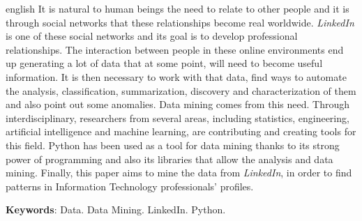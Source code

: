 \begin{resumo}[ABSTRACT]
 \begin{otherlanguage*}{english}
   It is natural to human beings the need to relate to other people and it is through social networks that these relationships become real worldwide. \textit{LinkedIn} is one of these social networks and its goal is to develop professional relationships. The interaction between people in these online environments end up generating a lot of data that at some point, will need to become useful information. It is then necessary to work with that data, find ways to automate the analysis, classification, summarization, discovery and characterization of them and also point out some anomalies. Data mining comes from this need. Through interdisciplinary, researchers from several areas, including statistics, engineering, artificial intelligence and machine learning, are contributing and creating tools for this field. Python has been used as a tool for data mining thanks to its strong power of programming and also its libraries that allow the analysis and data mining. Finally, this paper aims to mine the data from \textit{LinkedIn}, in order to find patterns in Information Technology professionals' profiles.
   
   
   \vspace{\onelineskip}
 
   \noindent 
   \textbf{Keywords}: Data. Data Mining. LinkedIn. Python.
 \end{otherlanguage*}
\end{resumo}

